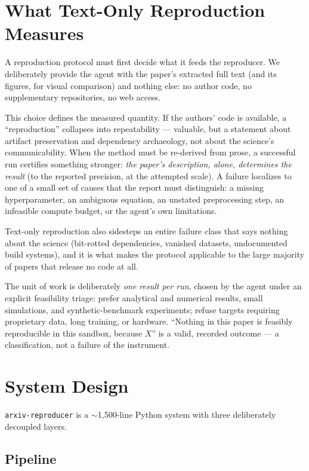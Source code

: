 \documentclass[10pt]{article}
\newcommand{\system}{\texttt{arxiv-reproducer}}
\begin{document}
\section{What Text-Only Reproduction Measures}\label{sec:textonly}

A reproduction protocol must first decide what it feeds the reproducer. We deliberately provide the agent with the paper's extracted full text (and its figures, for visual comparison) and nothing else: no author code, no supplementary repositories, no web access.

This choice defines the measured quantity. If the authors' code is available, a ``reproduction'' collapses into repeatability --- valuable, but a statement about artifact preservation and dependency archaeology, not about the science's communicability. When the method must be re-derived from prose, a successful run certifies something stronger: \emph{the paper's description, alone, determines the result} (to the reported precision, at the attempted scale). A failure localizes to one of a small set of causes that the report must distinguish: a missing hyperparameter, an ambiguous equation, an unstated preprocessing step, an infeasible compute budget, or the agent's own limitations.

Text-only reproduction also sidesteps an entire failure class that says nothing about the science (bit-rotted dependencies, vanished datasets, undocumented build systems), and it is what makes the protocol applicable to the large majority of papers that release no code at all.

The unit of work is deliberately \emph{one result per run}, chosen by the agent under an explicit feasibility triage: prefer analytical and numerical results, small simulations, and synthetic-benchmark experiments; refuse targets requiring proprietary data, long training, or hardware. ``Nothing in this paper is feasibly reproducible in this sandbox, because $X$'' is a valid, recorded outcome --- a classification, not a failure of the instrument.

\section{System Design}\label{sec:system}

\system{} is a $\sim$1{,}500-line Python system with three deliberately decoupled layers.

\subsection{Pipeline}
\end{document}
